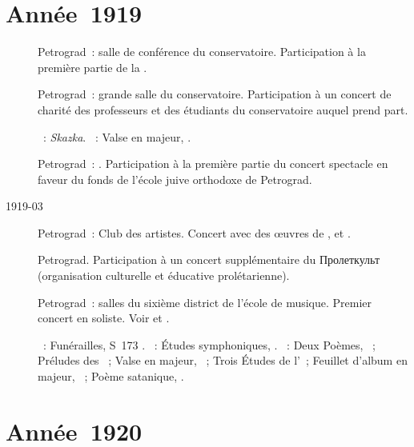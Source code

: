 \section{Année~1919}

\begin{description}
 \item[]
 Petrograd~: salle de conférence du conservatoire.
 Participation à la première partie de la .
 \item[]
 Petrograd~: grande salle du conservatoire.
 Participation à un concert de charité des professeurs et des étudiants du
 conservatoire auquel \VScriabina{} prend part.

 \textsc{\Medtner{}}~: \emph{Skazka}.
 \textsc{\Scriabine{}}~: Valse en \kA \Flat majeur, .
 \item[]
 Petrograd~: .
 Participation à la première partie du concert spectacle en faveur du fonds
 de l'école juive orthodoxe de Petrograd.
 \item[1919-03]
 Petrograd~: Club des artistes.
 Concert avec des œuvres de \Liszt{}, \Schumann{} et \Scriabine{}.
 \item[]
 Petrograd.
 Participation à un concert supplémentaire du \foreignlanguage{russian}
 {Пролеткульт} (organisation culturelle et éducative prolétarienne).
 \item[]
 Petrograd~: salles du sixième district de l'école de musique.
 Premier concert en soliste.
 Voir \citet[p.~435]{Milshteyn82a} et \citet[p.~394]{Scriabine}.

 \textsc{\Liszt{}}~: Funérailles, S~173 .
 \textsc{\Schumann{}}~: Études symphoniques, .
 \textsc{\Scriabine{}}~: Deux Poèmes, ~; Préludes des ~; Valse en \kA \Flat majeur, ~; Trois Études de
 l'~; Feuillet d'album en \kE \Flat majeur,  ~;
 Poème satanique, .
\end{description}

\section{Année~1920}

